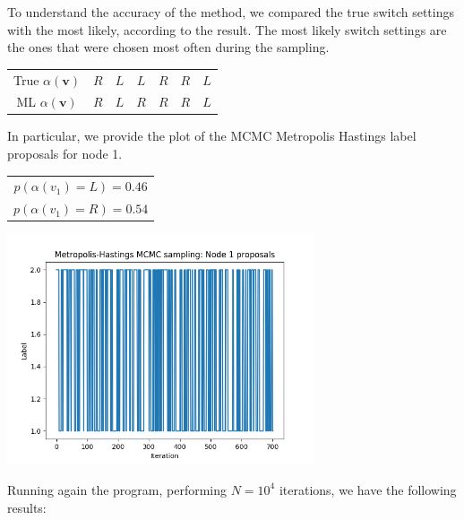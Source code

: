 \documentclass[]{article}
\begin{document}
	To understand the accuracy of the method, we compared the true switch settings with the most likely, according to the result. The most likely switch settings are the ones that were chosen most often during the sampling. 
	\begin{center}
		\begin{tabular}{| c | c | c | c | c | c | c |}
			True $\alpha(\mathbf{v})$ & $R$ & $L$ & $L$ & $R$ & $R$ & $L$ \\
			ML $\alpha(\mathbf{v})$ & $R$ & $L$ & $R$ & $R$ & $R$ & $L$ \\
		\end{tabular}
	\end{center}
	In particular, we provide the plot of the MCMC Metropolis Hastings label proposals for node 1.
	\begin{center}
		\begin{tabular}{| c |}
			$p(\alpha(v_1)=L) = 0.46 $ \\
			$p(\alpha(v_1)=R) = 0.54 $ \\
		\end{tabular}
	\end{center}
	\begin{center}
		\includegraphics[height=6.8cm]{task3/V_6_T_6_N_1000_Node1.png}
	\end{center}
	Running again the program, performing $N=10^4$ iterations, we have the following results:
\end{document}

